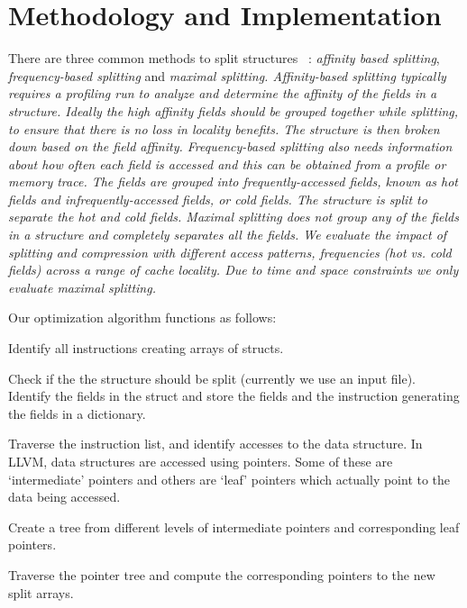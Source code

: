 \section{Methodology and Implementation}
\label{sec:meth}

There are three common methods to split structures~\cite{mpads} : { \em affinity based
splitting},  { \em frequency-based splitting} and \em {maximal splitting}. {\em
Affinity-based splitting} typically requires a profiling run to analyze and
determine the affinity of the fields in a structure. Ideally the high affinity
fields should be grouped together while splitting, to ensure that there is no
loss in locality benefits. The structure is then broken down based on the field
affinity. {\em Frequency-based splitting} also needs information about how often
each field is accessed and this can be obtained from a profile or memory trace.
The fields are grouped into frequently-accessed fields, known as hot fields and
infrequently-accessed fields, or cold fields. The structure is split to separate
the {\em hot} and {\em cold fields}. {\em Maximal splitting} does not group any
of the fields in a structure and completely separates all the fields. We
evaluate the impact of splitting and compression with different access patterns,
frequencies (hot vs. cold fields) across a range of cache locality. Due to time
and space constraints we only evaluate maximal splitting. 

Our optimization algorithm functions as follows:

\squishlist

\item Identify all instructions creating arrays of structs.

\item Check if the the structure should be split (currently we use an input file).
Identify the fields in the struct and store the fields and the instruction
generating the fields in a dictionary.

\item Traverse the instruction list, and identify accesses to the data structure. In
LLVM, data structures are accessed using pointers. Some of these are
‘intermediate’ pointers and others are ‘leaf’  pointers which actually point to
the data being accessed.

\item Create a tree from different levels of intermediate pointers and corresponding
leaf pointers.

\item Traverse the pointer tree and compute the corresponding pointers to the new
split arrays.

